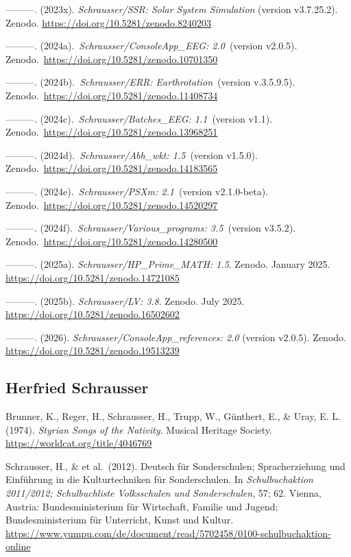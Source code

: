 \documentclass[
]{article}
\begin{document}
---------. (2023x). \emph{Schrausser/SSR: Solar System Simulation}
(version v3.7.25.2). Zenodo.
\url{https://doi.org/10.5281/zenodo.8240203}

---------. (2024a).~\emph{Schrausser/ConsoleApp\_EEG: 2.0}~(version
v2.0.5). Zenodo.~\url{https://doi.org/10.5281/zenodo.10701350}

---------. (2024b).~\emph{Schrausser/ERR: Earthrotation}~(version
v.3.5.9.5). Zenodo.~\url{https://doi.org/10.5281/zenodo.11408734}

---------. (2024c).~\emph{Schrausser/Batches\_EEG: 1.1}~(version v1.1).
Zenodo.~\url{https://doi.org/10.5281/zenodo.13968251}

---------. (2024d).~\emph{Schrausser/Abh\_wkt: 1.5}~(version v1.5.0).
Zenodo.~\url{https://doi.org/10.5281/zenodo.14183565}

---------. (2024e).~\emph{Schrausser/PSXm: 2.1}~(version v2.1.0-beta).
Zenodo.~\url{https://doi.org/10.5281/zenodo.14520297}

---------. (2024f).~\emph{Schrausser/Various\_programs: 3.5}~(version
v3.5.2). Zenodo.~\url{https://doi.org/10.5281/zenodo.14280500}

---------. (2025a). \emph{Schrausser/HP\_Prime\_MATH: 1.5}. Zenodo.
January 2025. \url{https://doi.org/10.5281/zenodo.14721085}

---------. (2025b). \emph{Schrausser/LV: 3.8}. Zenodo. July 2025.
\url{https://doi.org/10.5281/zenodo.16502602}

---------. (2026). \emph{Schrausser/ConsoleApp\_references: 2.0}
(version v2.0.5). Zenodo. \url{https://doi.org/10.5281/zenodo.19513239}

\hypertarget{herfried-schrausser}{%
\subsection{Herfried Schrausser}\label{herfried-schrausser}}

Brunner, K., Reger, H., Schrausser, H., Trupp, W., Günthert, E., \&
Uray, E. L. (1974). \emph{Styrian Songs of the Nativity}. Musical
Heritage Society. \url{https://worldcat.org/title/4046769}

Schrausser, H., \& et al.~(2012). Deutsch für Sonderschulen;
Spracherziehung und Einführung in die Kulturtechniken für Sonderschulen.
In \emph{Schulbuchaktion 2011/2012; Schulbuchliste Volksschulen und
Sonderschulen}, 57; 62. Vienna, Austria: Bundesministerium für
Wirtschaft, Familie und Jugend; Bundesministerium für Unterricht, Kunst
und Kultur.
\url{https://www.yumpu.com/de/document/read/5702458/0100-schulbuchaktion-online}
\end{document}
